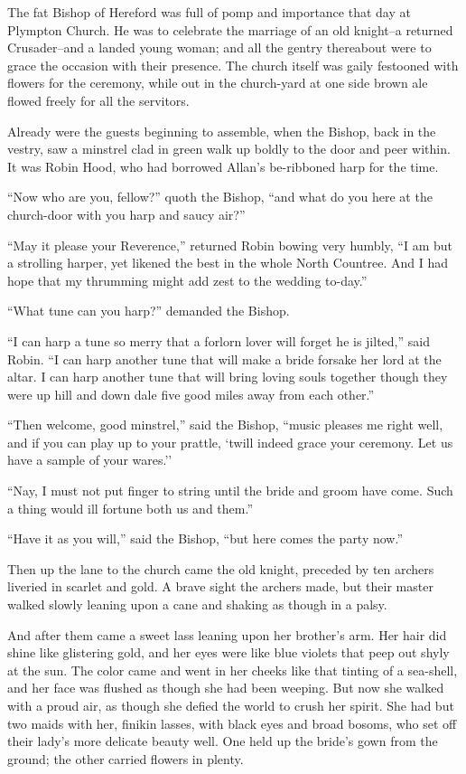 The fat Bishop of Hereford was full of pomp and importance that day at
Plympton Church. He was to celebrate the marriage of an old knight--a
returned Crusader--and a landed young woman; and all the gentry
thereabout were to grace the occasion with their presence. The church
itself was gaily festooned with flowers for the ceremony, while out in
the church-yard at one side brown ale flowed freely for all the
servitors.

Already were the guests beginning to assemble, when the Bishop, back in
the vestry, saw a minstrel clad in green walk up boldly to the door and
peer within. It was Robin Hood, who had borrowed Allan's be-ribboned
harp for the time.

``Now who are you, fellow?'' quoth the Bishop, ``and what do you here at
the church-door with you harp and saucy air?''

``May it please your Reverence,'' returned Robin bowing very humbly, ``I
am but a strolling harper, yet likened the best in the whole North
Countree. And I had hope that my thrumming might add zest to the wedding
to-day.''

``What tune can you harp?'' demanded the Bishop.

``I can harp a tune so merry that a forlorn lover will forget he is
jilted,'' said Robin. ``I can harp another tune that will make a bride
forsake her lord at the altar. I can harp another tune that will bring
loving souls together though they were up hill and down dale five good
miles away from each other.''

``Then welcome, good minstrel,'' said the Bishop, ``music pleases me
right well, and if you can play up to your prattle, `twill indeed grace
your ceremony. Let us have a sample of your wares.''

``Nay, I must not put finger to string until the bride and groom have
come. Such a thing would ill fortune both us and them.''

``Have it as you will,'' said the Bishop, ``but here comes the party
now.''

Then up the lane to the church came the old knight, preceded by ten
archers liveried in scarlet and gold. A brave sight the archers made,
but their master walked slowly leaning upon a cane and shaking as though
in a palsy.

And after them came a sweet lass leaning upon her brother's arm. Her
hair did shine like glistering gold, and her eyes were like blue violets
that peep out shyly at the sun. The color came and went in her cheeks
like that tinting of a sea-shell, and her face was flushed as though she
had been weeping. But now she walked with a proud air, as though she
defied the world to crush her spirit. She had but two maids with her,
finikin lasses, with black eyes and broad bosoms, who set off their
lady's more delicate beauty well. One held up the bride's gown from the
ground; the other carried flowers in plenty.

